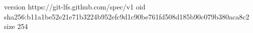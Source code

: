 version https://git-lfs.github.com/spec/v1
oid sha256:b11a1be52e21e71b3224b952efc9d1c90be761fd508d185b90c079b380aca8c2
size 254
